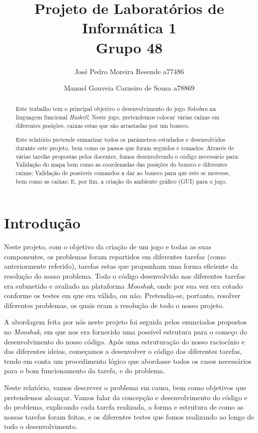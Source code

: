 \documentclass[a4paper]{article}
\title{Projeto de Laboratórios de Informática 1\\Grupo 48}
\author{José Pedro Moreira Resende a77486 \and Manuel Gouveia Carneiro de Sousa a78869}
\begin{document}
\maketitle

\begin{abstract}
Este trabalho tem o principal objetivo o desenvolvimento do jogo \textit{Sokoban} na linguagem funcional \textit{Haskell}. Neste jogo, pretendemos colocar várias caixas em diferentes posições, caixas estas que são arrastadas por um boneco. 

Este relatório pretende sumarizar todos os parâmetros estudados e desenvolvidos durante este projeto, bem como os passos que foram seguidos e tomados. Através de várias tarefas propostas pelos docentes, fomos desenvolvendo o código necessário para: Validação do mapa bem como as coordenadas das posições do boneco e diferentes caixas; Validação de possíveis comandos a dar ao boneco para que este se movesse, bem como as caixas; E, por fim, a criação do ambiente gráfico (GUI) para o jogo.

\end{abstract}

\tableofcontents
\newpage

\section{Introdução}
\label{sec:intro}

Neste projeto, com o objetivo da criação de um jogo e todas as suas componentes, os problemas foram repartidos em diferentes tarefas (como anteriormente referido), tarefas estas que propunham uma forma eficiente da resolução do nosso problema. Todo o código desenvolvido nas diferentes tarefas era submetido e avaliado na plataforma \textit{Mooshak}, onde por sua vez era cotado conforme os testes em que era válido, ou não. Pretendia-se, portanto, resolver diferentes problemas, os quais eram a resolução de todo o nosso projeto.

A abordagem feita por nós neste projeto foi seguida pelos enunciados propostos no \textit{Mooshak}, em que nos era fornecido uma possível estrutura para o começo do desenvolvimento do nosso código. Após uma estruturação do nosso raciocínio e das diferentes ideias, começamos a desenvolver o código das diferentes tarefas, tendo em conta um procedimento lógico que abordasse todos os casos necessários para o bom funcionamento da tarefa, e do problema.

Neste relatório, vamos descrever o problema em causa, bem como objetivos que pretendemos alcançar. Vamos falar da concepção e desenvolvimento do código e do problema, explicando cada tarefa realizada, a forma e estrutura de como as nossas tarefas foram feitas, e os diferentes testes que fomos realizando ao longo de todo o desenvolvimento. 
\end{document}

